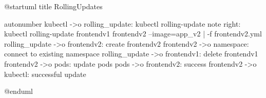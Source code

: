 @startuml
title RollingUpdates

autonumber
kubectl ->o rolling_update: kubectl rolling-update
note right: kubectl rolling-update frontendv1 frontendv2 --image=app_v2 | -f frontendv2.yml
rolling_update ->o frontendv2: create frontendv2
frontendv2 ->o namespace: connect to existing namespace
rolling_update ->o frontendv1: delete frontendv1
frontendv2 ->o pods: update pods
pods ->o frontendv2: success
frontendv2 ->o kubectl: successful update

@enduml
